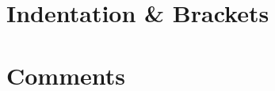 \documentclass{article}
\begin{document}
%


\newpage

% 

\section{Indentation \& Brackets}




%


\newpage

% 

\section{Comments}




%
\end{document}
